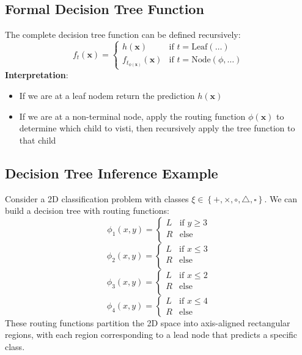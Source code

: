 \documentclass[a4paper]{article}
\theoremstyle{definition}
\begin{document}
\subsection{Formal Decision Tree Function}
The complete decision tree function can be defined recursively:
\[
f_t(\mathbf{x}) =
\begin{cases}
  h(\mathbf{x}) & \text{if } t = \text{Leaf}(\dots) \\
  f_{t_{\phi(\mathbf{x})}}(\mathbf{x}) & \text{if } t = \text{Node}(\phi, \dots)
\end{cases}
\]
\textbf{Interpretation}:
\begin{itemize}
    \item If we are at a leaf nodem return the prediction \( h(\mathbf{x}) \)   
    \item If we are at a non-terminal node, apply the routing function \( \phi(\mathbf{x}) \) to determine which child to visti, then recursively apply the tree function to that child
\end{itemize}
\subsection{Decision Tree Inference Example}
Consider a 2D classification problem with classes \( \xi \in \left\{ +, \times, \circ, \bigtriangleup, \square \right\} \). We can build a decision 
tree with routing functions:
\[
  \phi_1(x,y) = 
  \begin{cases}
    L & \text{if } y \geq 3 \\
    R & \text{else} \\
  \end{cases}
\] 
\[
  \phi_2(x,y) = 
  \begin{cases}
    L & \text{if } x \leq 3 \\
    R & \text{else} \\
  \end{cases}
\]
\[
  \phi_3(x,y) = 
  \begin{cases}
    L & \text{if } x \leq 2 \\
    R & \text{else} \\
  \end{cases}
\]
\[
  \phi_4(x,y) = 
  \begin{cases}
    L & \text{if } x \leq 4 \\
    R & \text{else}
  \end{cases}
\]
These routing functions partition the 2D space into axis-aligned rectangular regions, with each region corresponding 
to a lead node that predicts a specific class.
\end{document}
